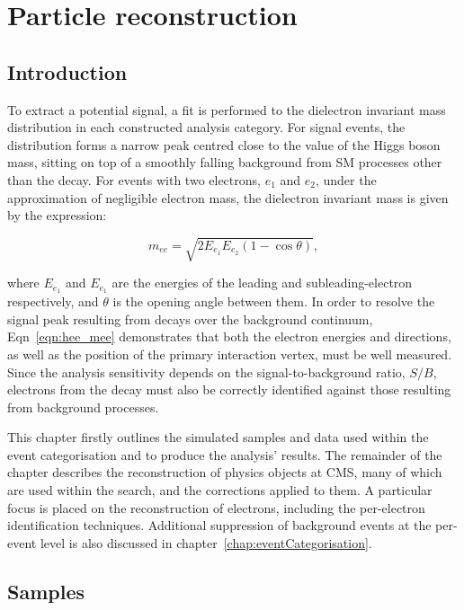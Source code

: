 \chapter{Particle reconstruction}
\label{chap:objectReco}

\section{Introduction}

To extract a potential \Hee signal, a fit is performed to the dielectron invariant mass distribution in each constructed analysis category. For \Hee signal events, the \mee distribution forms a narrow peak centred close to the value of the Higgs boson mass, sitting on top of a smoothly falling background from SM processes other than the \Hee decay. For events with two electrons, $e_{1}$ and $e_{2}$, under the approximation of negligible electron mass, the dielectron invariant mass is given by the expression:

\begin{equation}\label{eqn:hee_mee}
    m_{ee} = \sqrt{2E_{e_1}E_{e_2}(1-\cos{\theta})},
\end{equation}


\noindent where $E_{e_1}$ and $E_{e_1}$ are the energies of the leading and subleading-\Et electron respectively, and $\theta$ is the opening angle between them. In order to resolve the signal peak resulting from \Hee decays over the background continuum, Eqn~\ref{eqn:hee_mee} demonstrates that both the electron energies and directions, as well as the position of the primary interaction vertex, must be well measured. Since the analysis sensitivity depends on the signal-to-background ratio, $S/B$, electrons from the \Hee decay must also be correctly identified against those resulting from background processes. 

This chapter firstly outlines the simulated samples and data used within the event categorisation and to produce the analysis' results. The remainder of the chapter describes the reconstruction of physics objects at CMS, many of which are used within the \Hee search, and the corrections applied to them. A particular focus is placed on the reconstruction of electrons, including the per-electron identification techniques. Additional suppression of background events at the per-event level is also discussed in chapter~\ref{chap:eventCategorisation}. 

\section{Samples}


